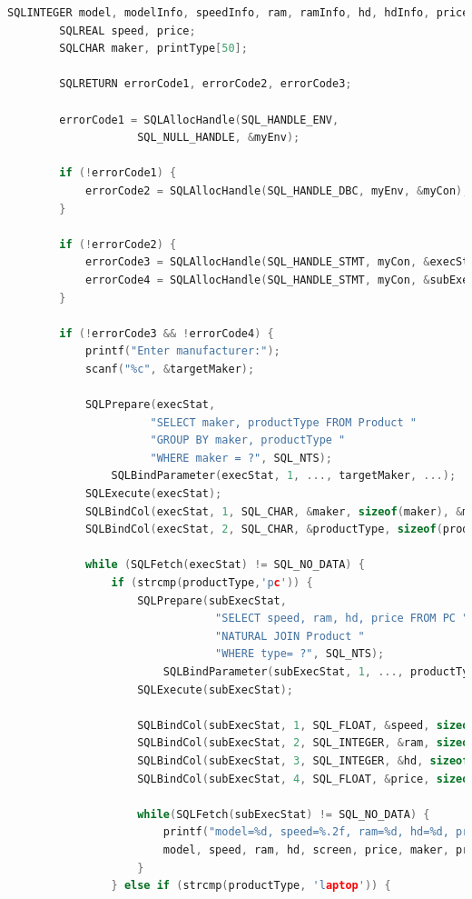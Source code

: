 \documentclass[12pt]{article}
\begin{document}
\begin{enumerate}[1.]
\begin{enumerate}[a)]
\begin{lstlisting}[language=c]
        SQLINTEGER model, modelInfo, speedInfo, ram, ramInfo, hd, hdInfo, priceInfo, makerInfo, screen, screenInfo, color, colorInfo, printTypeInfo;
        SQLREAL speed, price;
        SQLCHAR maker, printType[50];

        SQLRETURN errorCode1, errorCode2, errorCode3;

        errorCode1 = SQLAllocHandle(SQL_HANDLE_ENV,
                    SQL_NULL_HANDLE, &myEnv);

        if (!errorCode1) {
            errorCode2 = SQLAllocHandle(SQL_HANDLE_DBC, myEnv, &myCon);
        }

        if (!errorCode2) {
            errorCode3 = SQLAllocHandle(SQL_HANDLE_STMT, myCon, &execStat);
            errorCode4 = SQLAllocHandle(SQL_HANDLE_STMT, myCon, &subExecStat);
        }

        if (!errorCode3 && !errorCode4) {
            printf("Enter manufacturer:");
            scanf("%c", &targetMaker);

            SQLPrepare(execStat,
                      "SELECT maker, productType FROM Product "
                      "GROUP BY maker, productType "
                      "WHERE maker = ?", SQL_NTS);
                SQLBindParameter(execStat, 1, ..., targetMaker, ...);
            SQLExecute(execStat);
            SQLBindCol(execStat, 1, SQL_CHAR, &maker, sizeof(maker), &makerInfo);
            SQLBindCol(execStat, 2, SQL_CHAR, &productType, sizeof(productType), &productTypeInfo);

            while (SQLFetch(execStat) != SQL_NO_DATA) {
                if (strcmp(productType,'pc')) {
                    SQLPrepare(subExecStat,
                                "SELECT speed, ram, hd, price FROM PC "
                                "NATURAL JOIN Product "
                                "WHERE type= ?", SQL_NTS);
                        SQLBindParameter(subExecStat, 1, ..., productType, ...);
                    SQLExecute(subExecStat);

                    SQLBindCol(subExecStat, 1, SQL_FLOAT, &speed, sizeof(speed), &speedInfo);
                    SQLBindCol(subExecStat, 2, SQL_INTEGER, &ram, sizeof(ram), &ramInfo);
                    SQLBindCol(subExecStat, 3, SQL_INTEGER, &hd, sizeof(hd), &hdInfo);
                    SQLBindCol(subExecStat, 4, SQL_FLOAT, &price, sizeof(price), &priceInfo);

                    while(SQLFetch(subExecStat) != SQL_NO_DATA) {
                        printf("model=%d, speed=%.2f, ram=%d, hd=%d, price=%.2f, maker=%c, type=%s",
                        model, speed, ram, hd, screen, price, maker, productType);
                    }
                } else if (strcmp(productType, 'laptop')) {


\end{lstlisting}
\end{enumerate}
\end{enumerate}
\end{document}
